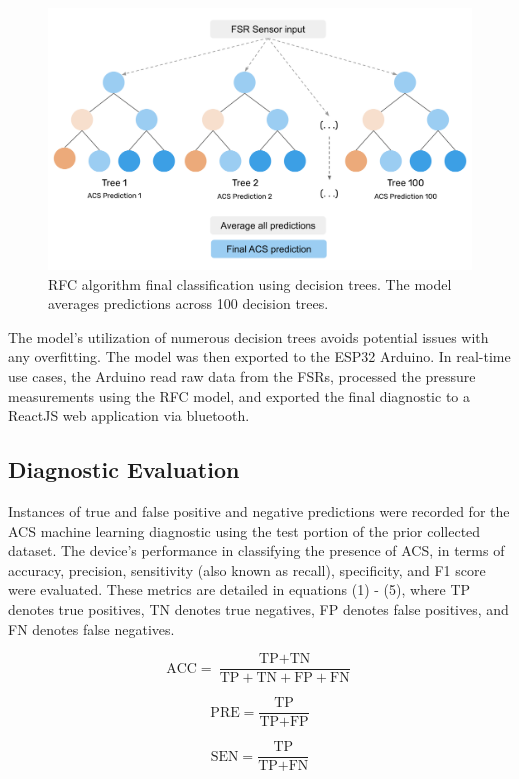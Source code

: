 \documentclass{article}
\begin{document}
\begin{figure}[H] %
    \centering
    \includegraphics[width=0.7\linewidth]{RFC_diagram.png}
    \caption{RFC algorithm final classification using decision trees. The model averages predictions across 100 decision trees.}
    \label{fig:fig2}
\end{figure}

The model’s utilization of numerous decision trees avoids potential issues with any overfitting. The model was then exported to the ESP32 Arduino. In real-time use cases, the Arduino read raw data from the FSRs, processed the pressure measurements using the RFC model, and exported the final diagnostic to a ReactJS web application via bluetooth. 

\subsection{Diagnostic Evaluation}
Instances of true and false positive and negative predictions were recorded for the ACS machine learning diagnostic using the test portion of the prior collected dataset. The device’s performance in classifying the presence of ACS, in terms of accuracy, precision, sensitivity (also known as recall), specificity, and F1 score were evaluated. These metrics are detailed in equations (1) - (5), where TP denotes true positives, TN denotes true negatives, FP denotes false positives, and FN denotes false negatives.

\begin{equation}
    \text{ACC} = \frac{\text{TP} + \text{TN}}{\text{TP} + \text{TN} + \text{FP} + \text{FN}}
\end{equation}

\begin{equation}
    \text{PRE} = \frac{\text{TP}}{\text{TP} + \text{FP}}
\end{equation}

\begin{equation}
    \text{SEN} = \frac{\text{TP}}{\text{TP} + \text{FN}}
\end{equation}
\end{document}
